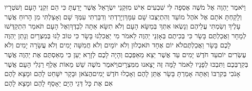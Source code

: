\documentclass[../main/main.tex]{subfiles}
\begin{document}
\begin{multicols}{\ncols}
וַיֹּאמֶר יַהְוֶה אֶל מֹשֶׁה אֶסְפָה לִּי שִׁבְעִים אִישׁ מִזִּקְנֵי יִשְׂרָאֵל אֲשֶׁר יָדַעְתָּ כִּי הֵם זִקְנֵי הָעָם וְשֹׁטְרָיו וְלָקַחְתָּ אֹתָם אֶל אֹהֶל מוֹעֵד וְהִתְיַצְּבוּ שָׁם עִמָּךְ\PreVerseSpace{}וְיָרַדְתִּי וְדִבַּרְתִּי עִמְּךָ שָׁם וְאָצַלְתִּי מִן הָרוּחַ אֲשֶׁר עָלֶיךָ וְשַׂמְתִּי עֲלֵיהֶם וְנָשְׂאוּ אִתְּךָ בְּמַשָּׂא הָעָם וְלֹא תִשָּׂא אַתָּה לְבַדֶּךָ\PreVerseSpace{}וְאֶל הָעָם תֹּאמַר הִתְקַדְּשׁוּ לְמָחָר וַאֲכַלְתֶּם בָּשָׂר כִּי בְּכִיתֶם בְּאָזְנֵי יַהְוֶה לֵאמֹר מִי יַאֲכִלֵנוּ בָּשָׂר כִּי טוֹב לָנוּ בְּמִצְרָיִם וְנָתַן יַהְוֶה לָכֶם בָּשָׂר וַאֲכַלְתֶּם\PreVerseSpace{}לֹא יוֹם אֶחָד תֹּאכְלוּן וְלֹא יוֹמָיִם וְלֹא חֲמִשָּׁה יָמִים וְלֹא עֲשָׂרָה יָמִים וְלֹא עֶשְׂרִים יוֹם\PreVerseSpace{}עַד חֹדֶשׁ יָמִים עַד אֲשֶׁר יֵצֵא מֵאַפְּכֶם וְהָיָה לָכֶם לְזָרָא יַעַן כִּי מְאַסְתֶּם אֶת יַהְוֶה אֲשֶׁר בְּקִרְבְּכֶם וַתִּבְכּוּ לְפָנָיו לֵאמֹר לָמָּה זֶּה יָצָאנוּ מִמִּצְרָיִם\PreVerseSpace{}וַיֹּאמֶר מֹשֶׁה שֵׁשׁ מֵאוֹת אֶלֶף רַגְלִי הָעָם אֲשֶׁר אָנֹכִי בְּקִרְבּוֹ וְאַתָּה אָמַרְתָּ בָּשָׂר אֶתֵּן לָהֶם וְאָכְלוּ חֹדֶשׁ יָמִים\PreVerseSpace{}הֲצֹאן וּבָקָר יִשָּׁחֵט לָהֶם וּמָצָא לָהֶם אִם אֶת כָּל דְּגֵי הַיָּם יֵאָסֵף לָהֶם וּמָצָא לָהֶם\OpenSection{}\par

\end{multicols}
\end{document}
